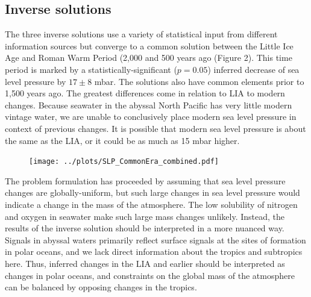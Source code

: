 \documentclass[12pt]{article}
\begin{document}
\subsection{Inverse solutions}

The three inverse solutions use a variety of statistical input from
different information sources but converge to a common solution
between the Little Ice Age and Roman Warm Period (2,000 and 500 years
ago (Figure 2). This time period is marked by a
statistically-significant ($p=0.05$) inferred decrease of sea level
pressure by $17 \pm 8$ mbar. The solutions also have common elements
prior to 1,500 years ago.  The greatest differences come in relation
to LIA to modern changes. Because seawater in the abyssal North
Pacific has very little modern vintage water, we are unable to
conclusively place modern sea level pressure in context of previous
changes. It is possible that modern sea level pressure is about the
same as the LIA, or it could be as much as 15 mbar higher.

\begin{figure}[htbp]
 \begin{center}
 \texttt{[image: ../plots/SLP\_CommonEra\_combined.pdf]} \\
  \end{center}
\end{figure}

The problem formulation has proceeded by assuming that sea level
pressure changes are globally-uniform, but such large changes in sea
level pressure would indicate a change in the mass of the
atmosphere. The low solubility of nitrogen and oxygen in seawater make
such large mass changes unlikely. Instead, the results of the inverse
solution should be interpreted in a more nuanced way. Signals in
abyssal waters primarily reflect surface signals at the sites of
formation in polar oceans, and we lack direct information about the
tropics and subtropics here. Thus, inferred changes in the LIA and
earlier should be interpreted as changes in polar oceans, and
constraints on the global mass of the atmosphere can be balanced by
opposing changes in the tropics.
\end{document}
